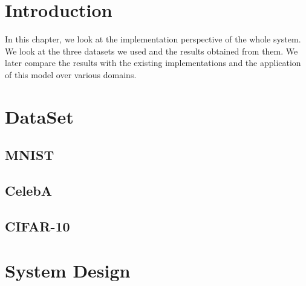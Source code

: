 

\section{Introduction}

In this chapter, we look at the implementation perspective of the whole system. We look at the three datasets we used and the results obtained from them. We later compare the results with the existing implementations and the application of this model over various domains. 


\section{DataSet}
\subsection{MNIST}
\subsection{CelebA}
\subsection{CIFAR-10}

\section{System Design}




